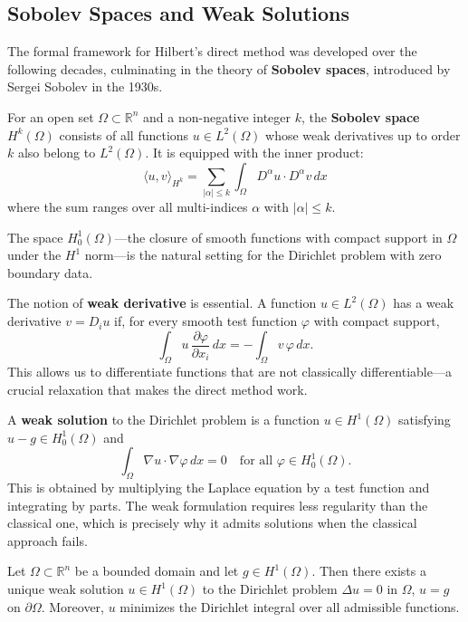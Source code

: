 \subsection{Sobolev Spaces and Weak Solutions}

The formal framework for Hilbert's direct method was developed over the following decades, culminating in the theory of \textbf{Sobolev spaces}, introduced by Sergei Sobolev in the 1930s.

\begin{definition}
For an open set $\Omega \subset \mathbb{R}^n$ and a non-negative integer $k$, the \textbf{Sobolev space} $H^k(\Omega)$ consists of all functions $u \in L^2(\Omega)$ whose weak derivatives up to order $k$ also belong to $L^2(\Omega)$. It is equipped with the inner product:
\[
    \langle u, v \rangle_{H^k} = \sum_{|\alpha| \leq k} \int_\Omega D^\alpha u \cdot D^\alpha v \, dx
\]
where the sum ranges over all multi-indices $\alpha$ with $|\alpha| \leq k$.
\end{definition}

The space $H^1_0(\Omega)$---the closure of smooth functions with compact support in $\Omega$ under the $H^1$ norm---is the natural setting for the Dirichlet problem with zero boundary data.

The notion of \textbf{weak derivative} is essential. A function $u \in L^2(\Omega)$ has a weak derivative $v = D_i u$ if, for every smooth test function $\varphi$ with compact support,
\[
    \int_\Omega u \, \frac{\partial \varphi}{\partial x_i} \, dx = -\int_\Omega v \, \varphi \, dx.
\]
This allows us to differentiate functions that are not classically differentiable---a crucial relaxation that makes the direct method work.

A \textbf{weak solution} to the Dirichlet problem is a function $u \in H^1(\Omega)$ satisfying $u - g \in H^1_0(\Omega)$ and
\[
    \int_\Omega \nabla u \cdot \nabla \varphi \, dx = 0 \quad \text{for all } \varphi \in H^1_0(\Omega).
\]
This is obtained by multiplying the Laplace equation by a test function and integrating by parts. The weak formulation requires less regularity than the classical one, which is precisely why it admits solutions when the classical approach fails.

\begin{theorem}
\label{thm:dirichlet-existence}
Let $\Omega \subset \mathbb{R}^n$ be a bounded domain and let $g \in H^1(\Omega)$. Then there exists a unique weak solution $u \in H^1(\Omega)$ to the Dirichlet problem $\Delta u = 0$ in $\Omega$, $u = g$ on $\partial\Omega$. Moreover, $u$ minimizes the Dirichlet integral over all admissible functions.
\end{theorem}

